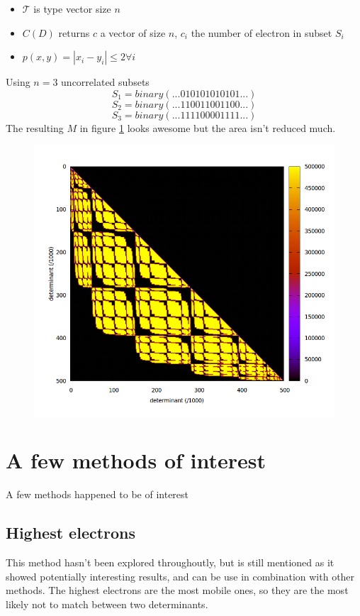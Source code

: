 \documentclass[./thesis.tex]{subfiles}
\begin{document}
\begin{itemize}
	\item
	$\mathcal{T}$ is type vector size $n$
	\item
	$C(D)$ returns $c$ a vector of size $n$, $c_i$ the number of electron in subset $S_i$
	\item
	$p(x, y) = |x_i - y_i| \leq 2 \forall i$
\end{itemize}



Using $n=3$ uncorrelated subsets
\begin{equation}
S_1 = binary(...010101010101...)
\end{equation}
\begin{equation}
S_2 = binary(...110011001100...)
\end{equation}
\begin{equation}
S_3 = binary(...111100001111...)
\end{equation}
The resulting $M$ in figure \ref{fig:num_subspace3} looks awesome but the area isn't reduced much.

\begin{figure}[h!]
	\begin{center}
		\includegraphics[width=0.6\columnwidth]{figures/davidson/num_subspace3}
		\caption{{\label{fig:num_subspace3}
		}}
	\end{center}
\end{figure}


\section{A few methods of interest}

A few methods happened to be of interest
\subsection{Highest electrons}
This method hasn't been explored throughoutly, but is still mentioned as it showed potentially interesting results, and can be use in combination with other methods.
The highest electrons are the most mobile ones, so they are the most likely not to match between two determinants. 
\end{document}
